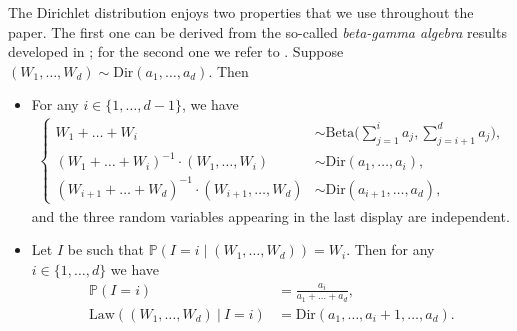\documentclass[11pt]{article}
\newcommand{\Pp}[1]{\mathbb{P} \left(#1\right)}
\newcommand{\Ppsq}[2]{\mathbb{P} \left(#1\mathrel{}\middle|\mathrel{}#2\right)}
\newcommand{\Dir}{\mathrm{Dir}}
\theoremstyle{plain}
\theoremstyle{definition}
\numberwithin{equation}{section}
\begin{document}
The Dirichlet distribution enjoys two properties that we use throughout the paper.
The first one can be derived from the so-called \emph{beta-gamma algebra} results developed in \cite{dufresne_algebraic_1998}; for the second one we refer to \cite[Lem.\,17]{addario-berry_critical_2010}.
Suppose $(W_1,\dots,W_d) \sim \Dir \left(a_1, \dots, a_d\right)$.
Then
\begin{itemize}
\item For any $i\in\{1,\dots,d-1\}$, we have
\begin{align}\label{eq:dirichlet distrib factorisation}\left\lbrace
\begin{aligned}
W_1+\dots + W_i &\sim \mathrm{Beta} \biggl( \sum_{j=1}^i a_j, \sum_{j=i+1}^d a_j \biggr), \\
(W_1+\dots + W_i)^{-1}\cdot (W_1,\dots ,W_i) &\sim \Dir(a_1, \dots, a_i),\\
(W_{i+1}+\dots + W_d)^{-1}\cdot (W_{i+1},\dots ,W_d) &\sim \Dir(a_{i+1}, \dots, a_d),
\end{aligned}
\right.
\end{align}
and the three random variables appearing in the last display are independent.
\item Let $I$ be such that $\Ppsq{I=i}{(W_1,\dots,W_d)}=W_i$. Then for any $i\in \{1,\dots,d\}$ we have
\begin{align}\label{eq:dirichlet distrib size-biaising}
\Pp{I=i} &= \frac{a_i}{a_1+\dots+a_d},\\
\mathrm{Law}\left((W_1,\dots,W_d) \ \vert \ I=i \right) &= \Dir \left(a_1, \dots,a_i+1,\dots, a_d\right). \label{eq:dirichlet distrib size-biaising_bis}
\end{align}
\end{itemize}
\end{document}
